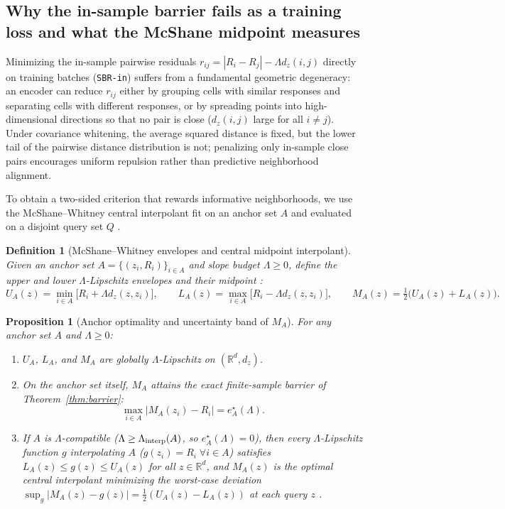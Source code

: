 \documentclass[preprint,11pt,a4paper]{elsarticle}
\newtheorem{definition}{Definition}
\newtheorem{proposition}{Proposition}
\newcommand{\R}{\mathbb{R}}
\begin{document}
\subsection{Why the in-sample barrier fails as a training loss and what the McShane midpoint measures}
\label{sec:insample}
\label{sec:crossfit}

Minimizing the in-sample pairwise residuals $r_{ij}=|R_i-R_j|-\Lambda d_z(i,j)$ directly on training batches (\texttt{SBR-in}) suffers from a fundamental geometric degeneracy: an encoder can reduce $r_{ij}$ either by grouping cells with similar responses and separating cells with different responses, or by spreading points into high-dimensional directions so that no pair is close ($d_z(i,j)$ large for all $i\ne j$). Under covariance whitening, the average squared distance is fixed, but the lower tail of the pairwise distance distribution is not; penalizing only in-sample close pairs encourages uniform repulsion rather than predictive neighborhood alignment.

To obtain a two-sided criterion that rewards informative neighborhoods, we use the McShane--Whitney central interpolant fit on an anchor set $A$ and evaluated on a disjoint query set $Q$ \cite{Beliakov2006,Calliess2017}.

\begin{definition}[McShane--Whitney envelopes and central midpoint interpolant]
\label{def:mcshane}
Given an anchor set $A=\{(z_i,R_i)\}_{i\in A}$ and slope budget $\Lambda\ge 0$, define the upper and lower $\Lambda$-Lipschitz envelopes and their midpoint \cite{McShane1934,Beliakov2006,Calliess2017}:
\begin{equation}
U_A(z)=\min_{i\in A}\big[R_i+\Lambda d_z(z,z_i)\big],
\qquad
L_A(z)=\max_{i\in A}\big[R_i-\Lambda d_z(z,z_i)\big],
\qquad
M_A(z)=\tfrac12\big(U_A(z)+L_A(z)\big).
\label{eq:mcshane}
\end{equation}
\end{definition}

\begin{proposition}[Anchor optimality and uncertainty band of $M_A$]
\label{prop:mcshane}
For any anchor set $A$ and $\Lambda\ge 0$:
\begin{enumerate}
    \item $U_A$, $L_A$, and $M_A$ are globally $\Lambda$-Lipschitz on $(\R^d,d_z)$.
    \item On the anchor set itself, $M_A$ attains the exact finite-sample barrier of Theorem~\ref{thm:barrier}:
    \begin{equation}
    \max_{i\in A}\big|M_A(z_i)-R_i\big| = e^\star_A(\Lambda).
    \end{equation}
    \item If $A$ is $\Lambda$-compatible ($\Lambda\ge\Lambda_{\rm interp}(A)$, so $e^\star_A(\Lambda)=0$), then every $\Lambda$-Lipschitz function $g$ interpolating $A$ ($g(z_i)=R_i\;\forall i\in A$) satisfies $L_A(z)\le g(z)\le U_A(z)$ for all $z\in\R^d$, and $M_A(z)$ is the optimal central interpolant minimizing the worst-case deviation $\sup_{g}\big|M_A(z)-g(z)\big|=\frac12(U_A(z)-L_A(z))$ at each query $z$ \cite{Beliakov2006}.
\end{enumerate}
\end{proposition}
\end{document}
